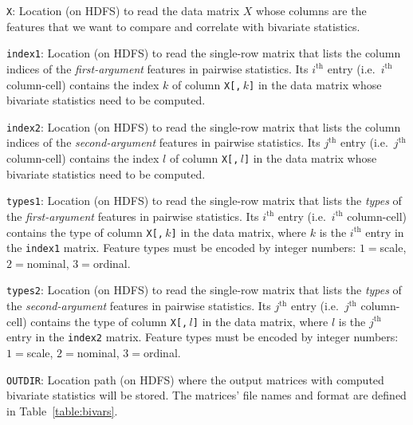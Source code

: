 \smallskip
{}
\begin{Description}
\item[{\tt X}:]
Location (on HDFS) to read the data matrix $X$ whose columns are the features
that we want to compare and correlate with bivariate statistics.
\item[{\tt index1}:] %
Location (on HDFS) to read the single-row matrix that lists the column indices
of the \emph{first-argument} features in pairwise statistics.
Its $i^{\textrm{th}}$ entry (i.e.\ $i^{\textrm{th}}$ column-cell) contains the
index $k$ of column \texttt{X[,$\,k$]} in the data matrix
whose bivariate statistics need to be computed.
\item[{\tt index2}:] %
Location (on HDFS) to read the single-row matrix that lists the column indices
of the \emph{second-argument} features in pairwise statistics.
Its $j^{\textrm{th}}$ entry (i.e.\ $j^{\textrm{th}}$ column-cell) contains the
index $l$ of column \texttt{X[,$\,l$]} in the data matrix
whose bivariate statistics need to be computed.
\item[{\tt types1}:] %
Location (on HDFS) to read the single-row matrix that lists the \emph{types}
of the \emph{first-argument} features in pairwise statistics.
Its $i^{\textrm{th}}$ entry (i.e.\ $i^{\textrm{th}}$ column-cell) contains the type
of column \texttt{X[,$\,k$]} in the data matrix, where $k$ is the $i^{\textrm{th}}$
entry in the {\tt index1} matrix.  Feature types must be encoded by
integer numbers: $1 = {}$scale, $2 = {}$nominal, $3 = {}$ordinal.
\item[{\tt types2}:] %
Location (on HDFS) to read the single-row matrix that lists the \emph{types}
of the \emph{second-argument} features in pairwise statistics.
Its $j^{\textrm{th}}$ entry (i.e.\ $j^{\textrm{th}}$ column-cell) contains the type
of column \texttt{X[,$\,l$]} in the data matrix, where $l$ is the $j^{\textrm{th}}$
entry in the {\tt index2} matrix.  Feature types must be encoded by
integer numbers: $1 = {}$scale, $2 = {}$nominal, $3 = {}$ordinal.
\item[{\tt OUTDIR}:]
Location path (on HDFS) where the output matrices with computed bivariate
statistics will be stored.  The matrices' file names and format are defined
in Table~\ref{table:bivars}.
\end{Description}

